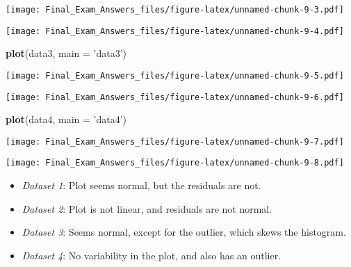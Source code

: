 \documentclass[]{article}
\newenvironment{Shaded}{\begin{snugshade}}{\end{snugshade}}
\newcommand{\KeywordTok}[1]{\textcolor[rgb]{0.13,0.29,0.53}{\textbf{#1}}}
\newcommand{\DataTypeTok}[1]{\textcolor[rgb]{0.13,0.29,0.53}{#1}}
\newcommand{\StringTok}[1]{\textcolor[rgb]{0.31,0.60,0.02}{#1}}
\newcommand{\OperatorTok}[1]{\textcolor[rgb]{0.81,0.36,0.00}{\textbf{#1}}}
\newcommand{\NormalTok}[1]{#1}
\providecommand{\tightlist}{%
  \setlength{\itemsep}{0pt}\setlength{\parskip}{0pt}}
\begin{document}
\texttt{[image: Final\_Exam\_Answers\_files/figure-latex/unnamed-chunk-9-3.pdf]}

\begin{Shaded}
\end{Shaded}

\texttt{[image: Final\_Exam\_Answers\_files/figure-latex/unnamed-chunk-9-4.pdf]}

\begin{Shaded}
\begin{Highlighting}[]
\KeywordTok{plot}\NormalTok{(data3, }\DataTypeTok{main =} \StringTok{'data3'}\NormalTok{)}
\end{Highlighting}
\end{Shaded}

\texttt{[image: Final\_Exam\_Answers\_files/figure-latex/unnamed-chunk-9-5.pdf]}

\begin{Shaded}
\end{Shaded}

\texttt{[image: Final\_Exam\_Answers\_files/figure-latex/unnamed-chunk-9-6.pdf]}

\begin{Shaded}
\begin{Highlighting}[]
\KeywordTok{plot}\NormalTok{(data4, }\DataTypeTok{main =} \StringTok{'data4'}\NormalTok{)}
\end{Highlighting}
\end{Shaded}

\texttt{[image: Final\_Exam\_Answers\_files/figure-latex/unnamed-chunk-9-7.pdf]}

\begin{Shaded}
\end{Shaded}

\texttt{[image: Final\_Exam\_Answers\_files/figure-latex/unnamed-chunk-9-8.pdf]}

\begin{itemize}
\tightlist
\item
  \emph{Dataset 1}: Plot seems normal, but the residuals are not.
\item
  \emph{Dataset 2}: Plot is not linear, and residuals are not normal.
\item
  \emph{Dataset 3}: Seems normal, except for the outlier, which skews
  the histogram.
\item
  \emph{Dataset 4}: No variability in the plot, and also has an outlier.
\end{itemize}
\end{document}
